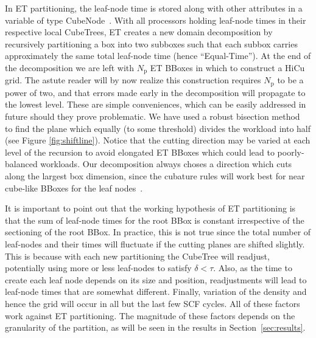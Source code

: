 \commentoutA{\documentclass[prb,aps,twocolumn,twocolumngrid]{revtex4}}
\newcommand{\Np}{N_{\mathrm{p}}} \newcommand{\Nbox}{N_{\mathrm{b}}}
\begin{document}
In ET partitioning, the leaf-node time is stored along with other attributes in a variable of 
type CubeNode~\cite{MChallacombe00A}.  With all processors holding leaf-node times in their 
respective local CubeTrees, ET creates a new domain decomposition by recursively partitioning
a box into two subboxes such that each subbox carries approximately the same total
leaf-node time (hence ``Equal-Time'').  At the end of the decomposition we are left with
$\Np$ ET BBoxes in which to construct a HiCu grid.  The astute reader will by now realize this
construction requires $\Np$ to be a power of two, and that errors made early in the decomposition
will propagate to the lowest level.  These are simple conveniences, which can be easily addressed 
in future should they prove problematic.  We have used a robust bisection method~\cite{WPress92} 
to find the plane which equally (to some threshold) divides the workload into half (see Figure
\ref{fig:shiftline}). Notice that the cutting direction may be varied
at each level of the recursion to avoid elongated ET BBoxes which could
lead to poorly-balanced workloads. Our decomposition always choses a direction
which cuts along the largest box dimension, since the cubature rules
will work best for near cube-like BBoxes for the leaf nodes~\cite{Stroud71}.

It is important to point out that the working hypothesis of ET partitioning 
is that the sum of leaf-node times for the root BBox is constant 
irrespective of the sectioning of the root BBox.  In practice, this is not true since 
the total number of leaf-nodes and their times will fluctuate if the cutting planes are 
shifted slightly. This is because with each new partitioning the CubeTree will 
readjust, potentially using more or less leaf-nodes to satisfy $\delta<\tau$.
Also, as the time to create each leaf node depends on its size and position, readjustments 
will lead to leaf-node times that are somewhat different. Finally, variation of the
density and hence the grid will occur in all but the last few SCF cycles.  All of these
factors work against  ET partitioning.  The magnitude of these factors depends
on the granularity of the partition, as will be seen in the results in
Section~\ref{sec:results}.


\end{document}
